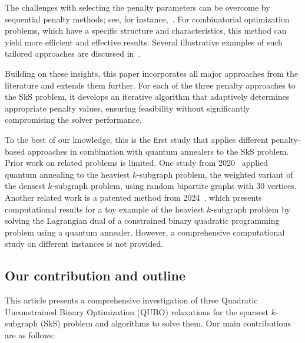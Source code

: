 \documentclass{article}
\begin{document}
The challenges with selecting the penalty parameters can be overcome by sequential penalty methods; see, for instance,~\cite{Garcia2022}. For combinatorial optimization problems,  which have a specific structure and characteristics, this method can yield more efficient and effective results. Several illustrative examples of such tailored approaches are discussed in~\cite{Quintero2020}.

Building on these insights, this paper incorporates all major approaches from the literature and extends them further. For each of the three penalty approaches to the SkS problem, it develops an iterative algorithm that adaptively determines appropriate penalty values, ensuring feasibility without significantly compromising the solver performance. 

To the best of our knowledge, this is the first study that applies different penalty-based approaches in combination with quantum annealers to the SkS problem. 
Prior work on related problems is limited. One study from 2020~\cite{Calude2020} applied quantum annealing to the heaviest $k$-subgraph problem, the weighted variant of the densest $k$-subgraph problem, using random bipartite graphs with 30 vertices. Another related work is a patented method from 2024~\cite{Ronah}, which presents computational results for a toy example of the heaviest $k$-subgraph problem by solving the Lagrangian dual of a constrained binary quadratic programming problem using a quantum annealer. However, a comprehensive computational study on different instances is not provided.

\subsection{Our contribution and outline}

This article presents a comprehensive investigation of three  Quadratic Unconstrained Binary Optimization (QUBO) relaxations for the sparsest $k$-subgraph (SkS) problem and algorithms to solve them. Our main contributions are as follows:
\end{document}
